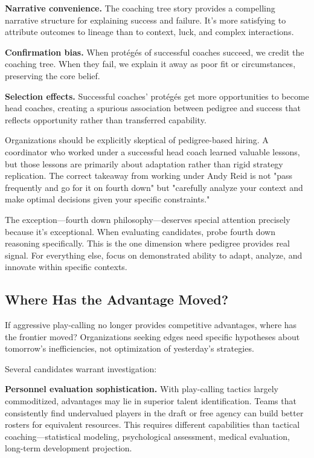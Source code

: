 \documentclass[11pt,twocolumn]{article}
\begin{document}
\textbf{Narrative convenience.} The coaching tree story provides a compelling narrative structure for explaining success and failure. It's more satisfying to attribute outcomes to lineage than to context, luck, and complex interactions.

\textbf{Confirmation bias.} When protégés of successful coaches succeed, we credit the coaching tree. When they fail, we explain it away as poor fit or circumstances, preserving the core belief.

\textbf{Selection effects.} Successful coaches' protégés get more opportunities to become head coaches, creating a spurious association between pedigree and success that reflects opportunity rather than transferred capability.

Organizations should be explicitly skeptical of pedigree-based hiring. A coordinator who worked under a successful head coach learned valuable lessons, but those lessons are primarily about adaptation rather than rigid strategy replication. The correct takeaway from working under Andy Reid is not "pass frequently and go for it on fourth down" but "carefully analyze your context and make optimal decisions given your specific constraints."

The exception---fourth down philosophy---deserves special attention precisely because it's exceptional. When evaluating candidates, probe fourth down reasoning specifically. This is the one dimension where pedigree provides real signal. For everything else, focus on demonstrated ability to adapt, analyze, and innovate within specific contexts.

\subsection{Where Has the Advantage Moved?}

If aggressive play-calling no longer provides competitive advantages, where has the frontier moved? Organizations seeking edges need specific hypotheses about tomorrow's inefficiencies, not optimization of yesterday's strategies.

Several candidates warrant investigation:

\textbf{Personnel evaluation sophistication.} With play-calling tactics largely commoditized, advantages may lie in superior talent identification. Teams that consistently find undervalued players in the draft or free agency can build better rosters for equivalent resources. This requires different capabilities than tactical coaching---statistical modeling, psychological assessment, medical evaluation, long-term development projection.
\end{document}
